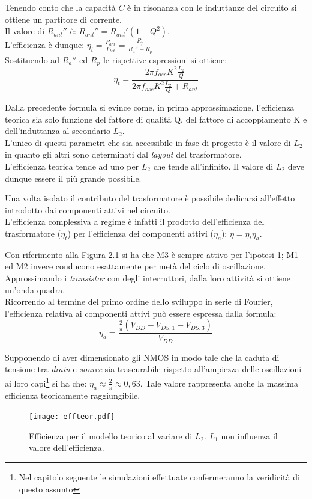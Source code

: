 \documentclass[a4paper, 12pt]{memoir}
\begin{document}
\noindent Tenendo conto che la capacità $C$ è in risonanza con le induttanze
del circuito si ottiene un partitore di corrente.\\
Il  valore di $ R_{ant}'' $ è: $ R_{ant}'' = R_{ant}' \left(1 + Q^2 \right) $.\\
L'efficienza è dunque:
$ \eta_t = \frac{P_{ant}}{P_{tot}} = \frac{R_p}{R_a'' + R_p} $
\\Sostituendo ad $R_a''$ ed $R_p$ le rispettive espressioni si ottiene:
$$ \eta_t = \frac{2\pi f_{osc} K^2 \frac{L_2}{Q}}{2\pi f_{osc} K^2
\frac{L_2}{Q} + R_{ant}} $$

Dalla precedente formula si evince come, in prima approssimazione, l'efficienza
teorica sia solo funzione del fattore di qualità Q, del fattore di 
accoppiamento K e dell'induttanza al secondario $L_2$.\\
L'unico di questi parametri che sia accessibile in fase di progetto è il
valore di $L_2$ in quanto  gli altri sono determinati dal \emph{layout} del
trasformatore.\\
L'efficienza teorica tende ad uno per $L_2$ che tende all'infinito. Il valore
di $L_2$ deve dunque essere il più grande possibile.

Una volta isolato il contributo del trasformatore è possibile dedicarsi 
all'effetto introdotto dai componenti attivi nel circuito.\\
L'efficienza complessiva a regime è infatti il prodotto dell'efficienza del
trasformatore ($\eta_t$) per l'efficienza dei componenti attivi ($\eta_a$):
$ \eta = \eta_t \eta_a $.

Con riferimento alla Figura 2.1 si ha che M3 è sempre attivo per l'ipotesi 1;
M1 ed M2 invece conducono esattamente per metà del ciclo di oscillazione.\\
Approssimando i \emph{transistor} con degli interruttori, dalla loro attività
si ottiene un'onda quadra.\\
Ricorrendo al termine del primo ordine dello sviluppo in serie di Fourier, 
l'efficienza relativa ai componenti attivi può essere espressa dalla formula:
\cite{Neviani14}$$ \eta_a=\frac{\frac{2}{\pi}\left(V_{DD}-V_{DS,1}-V_{DS,3}
\right)}{V_{DD}}$$

Supponendo di aver dimensionato gli NMOS in modo tale che la caduta di tensione
tra \emph{drain} e \emph{source} sia trascurabile rispetto all'ampiezza delle
oscillazioni ai loro capi\footnote{Nel capitolo seguente le simulazioni
effettuate confermeranno la veridicità di questo assunto} si ha che:  
$\eta_a \approx \frac{2}{\pi} \approx 0,63$. Tale valore rappresenta anche la
massima efficienza teoricamente raggiungibile.
\begin{figure}[h]
\centering
\texttt{[image: effteor.pdf]}
\caption{Efficienza per il modello teorico al variare di $L_2$. $ L_1 $ non
influenza il valore dell'efficienza.}
\end{figure}
\end{document}

